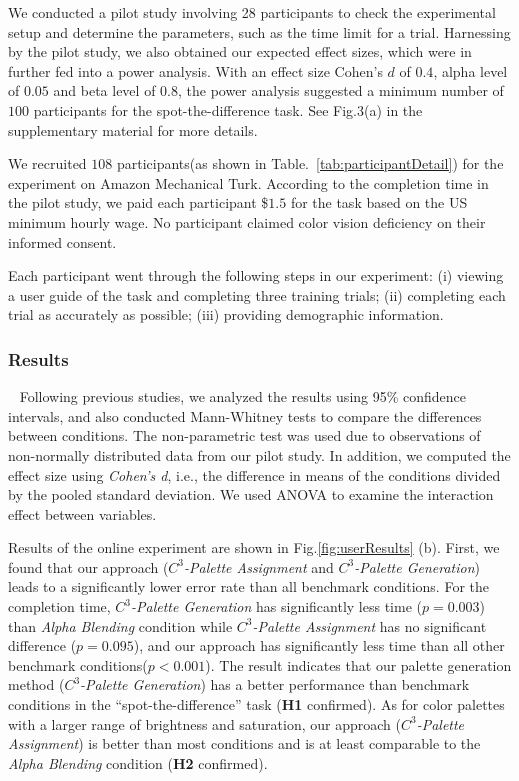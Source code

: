 {\vspace{.3em}
We conducted a pilot study involving 28 participants to check the experimental setup and determine the parameters, such as the time limit for a trial.
Harnessing by the pilot study, we also obtained our expected effect sizes, which were in further fed into a power analysis. With an effect size Cohen's $d$ of $0.4$, alpha level of $0.05$ and beta level of $0.8$, the power analysis suggested a minimum number of $100$ participants for the spot-the-difference task. See Fig.3(a) in the supplementary material for more details.


\vspace{.3em}
We recruited $108$ participants(as shown in Table.~\ref{tab:participantDetail}) for the experiment on Amazon Mechanical Turk.
According to the completion time in the pilot study, we paid each participant \$$1.5$ for the task based on the US minimum hourly wage.
No participant claimed color vision deficiency on their informed consent.

\vspace{.3em}
Each participant went through the following steps in our experiment: (i) viewing a user guide of the task and completing three training trials; (ii) completing each trial as accurately as possible; (iii) providing demographic information.

\subsubsection{Results}
\
\newline
Following previous studies, we analyzed the results using 95\% confidence intervals, and also conducted Mann-Whitney tests to compare the differences between conditions. The non-parametric test was used due to observations of non-normally distributed data from our pilot study. In addition, we computed the effect size using \emph{Cohen's d}, i.e., the difference in means of the conditions divided by the pooled standard deviation. We used ANOVA to examine the interaction effect between variables.


Results of the online experiment are shown in Fig.\ref{fig:userResults} (b).
First, we found that our approach (\emph{$C^3$-Palette Assignment} and \emph{$C^3$-Palette Generation}) leads to a significantly lower error rate than all benchmark conditions. For the completion time, \emph{$C^3$-Palette Generation} has significantly less time (\emph{$p = 0.003$}) than \emph{Alpha Blending} condition while \emph{$C^3$-Palette Assignment} has no significant difference (\emph{$p = 0.095$}), and our approach has significantly less time than all other benchmark conditions(\emph{$p < 0.001$}). The result indicates that our palette generation method (\emph{$C^3$-Palette Generation}) has a better performance than benchmark conditions in the ``spot-the-difference'' task (\textbf{H1} confirmed). As for color palettes with a larger range of brightness and saturation, our approach (\emph{$C^3$-Palette Assignment}) is better than most conditions and is at least comparable to the \emph{Alpha Blending} condition (\textbf{H2} confirmed).


}
